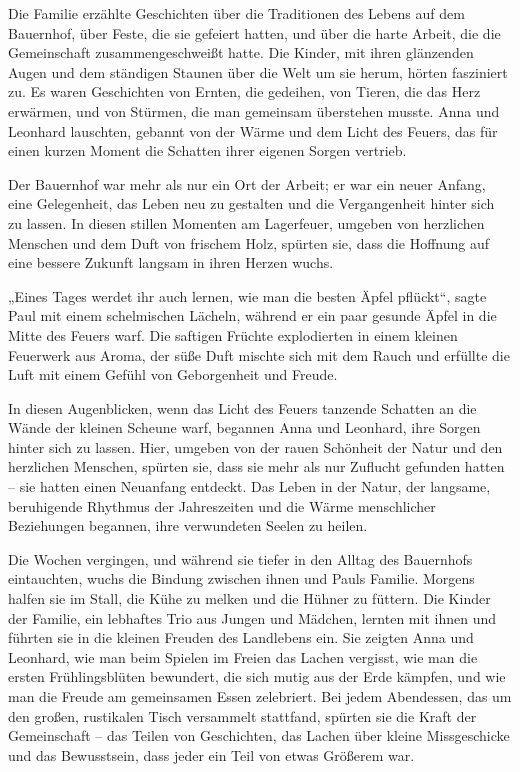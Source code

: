 \documentclass[
]{article}
\begin{document}
Die Familie erzählte Geschichten über die Traditionen des Lebens auf dem
Bauernhof, über Feste, die sie gefeiert hatten, und über die harte
Arbeit, die die Gemeinschaft zusammengeschweißt hatte. Die Kinder, mit
ihren glänzenden Augen und dem ständigen Staunen über die Welt um sie
herum, hörten fasziniert zu. Es waren Geschichten von Ernten, die
gedeihen, von Tieren, die das Herz erwärmen, und von Stürmen, die man
gemeinsam überstehen musste. Anna und Leonhard lauschten, gebannt von
der Wärme und dem Licht des Feuers, das für einen kurzen Moment die
Schatten ihrer eigenen Sorgen vertrieb.

Der Bauernhof war mehr als nur ein Ort der Arbeit; er war ein neuer
Anfang, eine Gelegenheit, das Leben neu zu gestalten und die
Vergangenheit hinter sich zu lassen. In diesen stillen Momenten am
Lagerfeuer, umgeben von herzlichen Menschen und dem Duft von frischem
Holz, spürten sie, dass die Hoffnung auf eine bessere Zukunft langsam in
ihren Herzen wuchs.

„Eines Tages werdet ihr auch lernen, wie man die besten Äpfel pflückt``,
sagte Paul mit einem schelmischen Lächeln, während er ein paar gesunde
Äpfel in die Mitte des Feuers warf. Die saftigen Früchte explodierten in
einem kleinen Feuerwerk aus Aroma, der süße Duft mischte sich mit dem
Rauch und erfüllte die Luft mit einem Gefühl von Geborgenheit und
Freude.

In diesen Augenblicken, wenn das Licht des Feuers tanzende Schatten an
die Wände der kleinen Scheune warf, begannen Anna und Leonhard, ihre
Sorgen hinter sich zu lassen. Hier, umgeben von der rauen Schönheit der
Natur und den herzlichen Menschen, spürten sie, dass sie mehr als nur
Zuflucht gefunden hatten -- sie hatten einen Neuanfang entdeckt. Das
Leben in der Natur, der langsame, beruhigende Rhythmus der Jahreszeiten
und die Wärme menschlicher Beziehungen begannen, ihre verwundeten Seelen
zu heilen.

Die Wochen vergingen, und während sie tiefer in den Alltag des
Bauernhofs eintauchten, wuchs die Bindung zwischen ihnen und Pauls
Familie. Morgens halfen sie im Stall, die Kühe zu melken und die Hühner
zu füttern. Die Kinder der Familie, ein lebhaftes Trio aus Jungen und
Mädchen, lernten mit ihnen und führten sie in die kleinen Freuden des
Landlebens ein. Sie zeigten Anna und Leonhard, wie man beim Spielen im
Freien das Lachen vergisst, wie man die ersten Frühlingsblüten
bewundert, die sich mutig aus der Erde kämpfen, und wie man die Freude
am gemeinsamen Essen zelebriert. Bei jedem Abendessen, das um den
großen, rustikalen Tisch versammelt stattfand, spürten sie die Kraft der
Gemeinschaft -- das Teilen von Geschichten, das Lachen über kleine
Missgeschicke und das Bewusstsein, dass jeder ein Teil von etwas
Größerem war.
\end{document}
